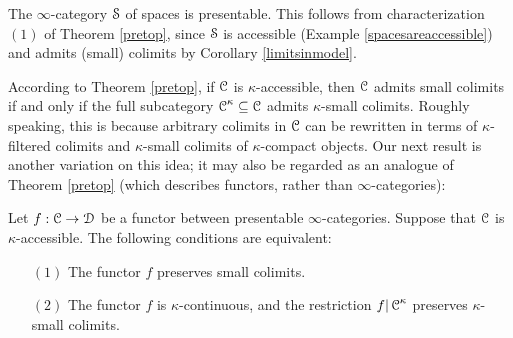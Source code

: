 \begin{example}\label{spacesarepresentable}
The $\infty$-category $\operatorname{\mathcal{S}}$ of spaces is presentable. This follows from characterization
$(1)$ of Theorem \ref{pretop}, since $\operatorname{\mathcal{S}}$ is accessible (Example \ref{spacesareaccessible}) and admits (small) colimits by Corollary \ref{limitsinmodel}.
\end{example}

According to Theorem \ref{pretop}, if $\operatorname{\mathcal{C}}$ is $\kappa$-accessible, then
$\operatorname{\mathcal{C}}$ admits small colimits if and only if the full subcategory $\operatorname{\mathcal{C}}^{\kappa} \subseteq \operatorname{\mathcal{C}}$
admits $\kappa$-small colimits. Roughly speaking, this is because arbitrary colimits in $\operatorname{\mathcal{C}}$ can be rewritten in terms of $\kappa$-filtered colimits and $\kappa$-small colimits of $\kappa$-compact objects. Our next result is another variation on this idea; it may also be regarded as an 
analogue of Theorem \ref{pretop} (which describes functors, rather than $\infty$-categories):

\begin{proposition}\label{sumatch}
Let $f: \operatorname{\mathcal{C}} \rightarrow \operatorname{\mathcal{D}}$ be a functor between presentable $\infty$-categories. Suppose that
$\operatorname{\mathcal{C}}$ is $\kappa$-accessible. The following conditions are equivalent:
\begin{itemize}
\item[$(1)$] The functor $f$ preserves small colimits.
\item[$(2)$] The functor $f$ is $\kappa$-continuous, and the restriction
$f| \operatorname{\mathcal{C}}^{\kappa}$ preserves $\kappa$-small colimits.
\end{itemize}
\end{proposition}

